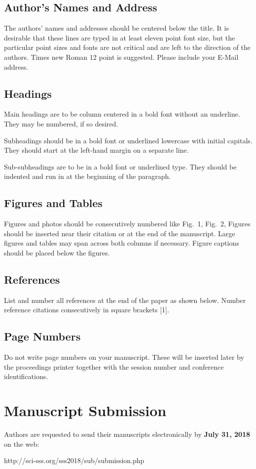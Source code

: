 \documentclass[a4paper]{article}
\begin{document}
\subsection{Author's Names and Address}
The authors' names and addresses should be centered below the title.
It is desirable that these lines are typed in at least eleven point font size,
but the particular point sizes and fonts are not critical and are left to the
direction of the authors.
Times new Roman 12 point is suggested.
Please include your E-Mail address. 

\subsection{Headings}
Main headings are to be column centered in a bold font without an underline.
They may be numbered, if so desired. 

Subheadings should be in a bold font or underlined lowercase with initial
capitals.
They should start at the left-hand margin on a separate line.

Sub-subheadings are to be in a bold font or underlined type.
They should be indented and run in at the beginning of the paragraph.

\subsection{Figures and Tables} 
Figures and photos should be consecutively numbered like Fig{.}~1, Fig{.}~2,
Figures should be inserted near their citation or at the end of the manuscript.
Large figures and tables may span across both columns if necessary.
Figure captions should be placed below the figures. 

\subsection{References}
List and number all references at the end of the paper as shown below.
Number reference citations consecutively in square brackets [1].

\subsection{Page Numbers}
Do not write page numbers on your manuscript.
These will be inserted later by the proceedings printer together with
the session number and conference identifications.


\section{Manuscript Submission}
Authors are requested to send their manuscripts electronically by
{\bf July 31, 2018} on the web:
\begin{center}
http://sci-sss.org/sss2018/sub/submission.php
\end{center}
\end{document}
